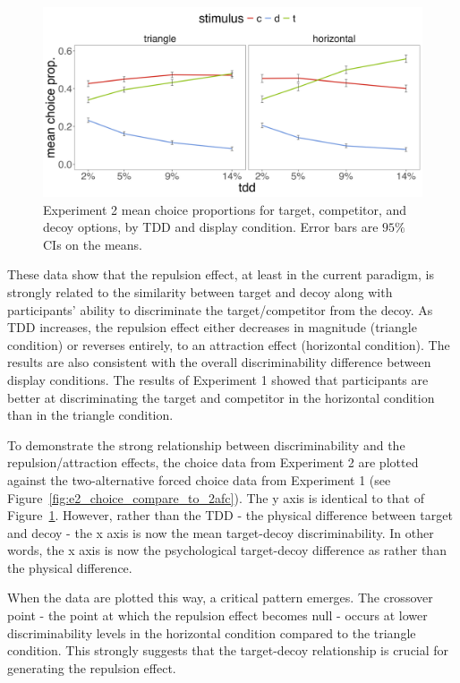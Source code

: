 \begin{figure}
   \includegraphics[width=\textwidth]{figures/choicePhase_att_trials_mean_choice_props_collapsed.jpg}
   \caption{Experiment 2 mean choice proportions for target, competitor, and decoy options, by TDD and display condition. Error bars are $95\%$ CIs on the means.}
   \label{fig:e2_choiceprops}
\end{figure}

These data show that the repulsion effect, at least in the current paradigm, is strongly related to the similarity between target and decoy along with participants' ability to discriminate the target/competitor from the decoy. As TDD increases, the repulsion effect either decreases in magnitude (triangle condition) or reverses entirely, to an attraction effect (horizontal condition). The results are also consistent with the overall discriminability difference between display conditions. The results of Experiment 1 showed that participants are better at discriminating the target and competitor in the horizontal condition than in the triangle condition. 

To demonstrate the strong relationship between discriminability and the repulsion/attraction effects, the choice data from Experiment 2 are plotted against the two-alternative forced choice data from Experiment 1 (see Figure~\ref{fig:e2_choice_compare_to_2afc}). The y axis is identical to that of Figure~\ref{fig:e2_choiceprops}. However, rather than the TDD - the physical difference between target and decoy - the x axis is now the mean target-decoy discriminability. In other words, the x axis is now the psychological target-decoy difference as rather than the physical difference. 

When the data are plotted this way, a critical pattern emerges. The crossover point - the point at which the repulsion effect becomes null - occurs at lower discriminability levels in the horizontal condition compared to the triangle condition. This strongly suggests that the target-decoy relationship is crucial for generating the repulsion effect.

